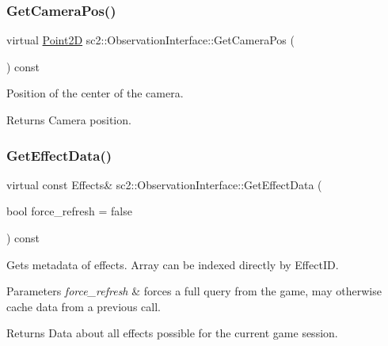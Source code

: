 \subsubsection{\texorpdfstring{Get\+Camera\+Pos()}{GetCameraPos()}}
{\footnotesize\ttfamily virtual \hyperlink{structsc2_1_1_point2_d}{Point2D} sc2\+::\+Observation\+Interface\+::\+Get\+Camera\+Pos (\begin{DoxyParamCaption}{ }\end{DoxyParamCaption}) const\hspace{0.3cm}{\ttfamily [pure virtual]}}

Position of the center of the camera. \begin{DoxyReturn}{Returns}
Camera position. 
\end{DoxyReturn}
\mbox{\label{classsc2_1_1_observation_interface_a2b3bae3c5a9e88f1164a11eba12c037f}} 
\subsubsection{\texorpdfstring{Get\+Effect\+Data()}{GetEffectData()}}
{\footnotesize\ttfamily virtual const Effects\& sc2\+::\+Observation\+Interface\+::\+Get\+Effect\+Data (\begin{DoxyParamCaption}\item[{bool}]{force\+\_\+refresh = {\ttfamily false} }\end{DoxyParamCaption}) const\hspace{0.3cm}{\ttfamily [pure virtual]}}

Gets metadata of effects. Array can be indexed directly by Effect\+ID. 
\begin{DoxyParams}{Parameters}
{\em force\+\_\+refresh} & forces a full query from the game, may otherwise cache data from a previous call. \\
\hline
\end{DoxyParams}
\begin{DoxyReturn}{Returns}
Data about all effects possible for the current game session. 
\end{DoxyReturn}
\mbox{\label{classsc2_1_1_observation_interface_a1c558b2b552f4132938afedc309f7295}} 
